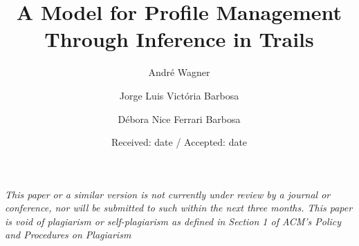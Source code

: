 \documentclass{svjour3}                     %
\begin{document}
\title{A Model for Profile Management Through Inference in Trails%
}


\author{André Wagner                     \and
        Jorge Luis Victória Barbosa	 \and
	Débora Nice Ferrari Barbosa
}



\date{Received: date / Accepted: date}


\maketitle

\textit{This paper or a similar version is not currently under review by a journal or conference, nor will be submitted to such within the next three months. This paper is void of plagiarism or self-plagiarism as defined in Section 1 of ACM's Policy and Procedures on Plagiarism}\\[1cm]
\end{document}

